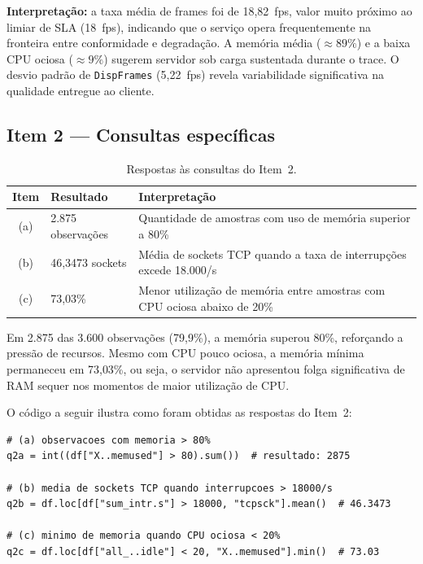 \documentclass[12pt,a4paper]{article}
\begin{document}
\textbf{Interpretação:} a taxa média de frames foi de 18{,}82~fps, valor muito
próximo ao limiar de SLA (18~fps), indicando que o serviço opera frequentemente
na fronteira entre conformidade e degradação. A memória média ($\approx 89\%$) e
a baixa CPU ociosa ($\approx 9\%$) sugerem servidor sob carga sustentada durante o
trace. O desvio padrão de \texttt{DispFrames} (5{,}22~fps) revela variabilidade
significativa na qualidade entregue ao cliente.

\subsection{Item 2 --- Consultas específicas}

\begin{table}[H]
\centering
\caption{Respostas às consultas do Item~2.}
\label{tab:consultas}
\renewcommand{\arraystretch}{1.2}
\begin{tabular}{clp{8.5cm}}
\toprule
\textbf{Item} & \textbf{Resultado} & \textbf{Interpretação} \\
\midrule
(a) & 2.875 observações & Quantidade de amostras com uso de memória superior a 80\% \\
(b) & 46{,}3473 sockets   & Média de sockets TCP quando a taxa de interrupções excede 18.000/s \\
(c) & 73{,}03\%           & Menor utilização de memória entre amostras com CPU ociosa abaixo de 20\% \\
\bottomrule
\end{tabular}
\end{table}

Em 2.875 das 3.600 observações (79{,}9\%), a memória superou 80\%,
reforçando a pressão de recursos. Mesmo com CPU pouco ociosa, a memória mínima
permaneceu em 73{,}03\%, ou seja, o servidor não apresentou folga significativa de RAM
sequer nos momentos de maior utilização de CPU.

O código a seguir ilustra como foram obtidas as respostas do Item~2:

\begin{lstlisting}[caption={Consultas específicas sobre o dataset (Item~2 da Task~I).}]
# (a) observacoes com memoria > 80%
q2a = int((df["X..memused"] > 80).sum())  # resultado: 2875

# (b) media de sockets TCP quando interrupcoes > 18000/s
q2b = df.loc[df["sum_intr.s"] > 18000, "tcpsck"].mean()  # 46.3473

# (c) minimo de memoria quando CPU ociosa < 20%
q2c = df.loc[df["all_..idle"] < 20, "X..memused"].min()  # 73.03
\end{lstlisting}
\end{document}
